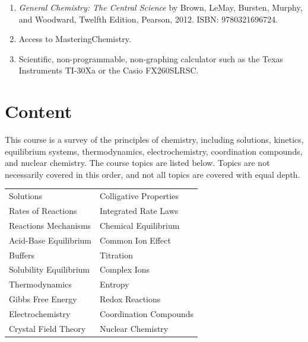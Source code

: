 \documentclass[letterpaper,oneside,onecolumn,11pt,article]{memoir}
\begin{document}
\begin{enumerate}
\item \textit{General Chemistry: The Central Science} by Brown, LeMay, Bursten, Murphy, and Woodward, Twelfth Edition, Pearson, 2012. ISBN: 9780321696724. 

\item Access to MasteringChemistry. 

\item Scientific, non-programmable, non-graphing calculator such as the Texas Instruments TI-30Xa or the  Casio FX260SLRSC.
\end{enumerate}


\section{Content}

This course is a survey of the principles of chemistry, including solutions, kinetics, equilibrium systems, thermodynamics, electrochemistry, coordination compounds, and nuclear chemistry. The course topics are listed below. Topics are not necessarily covered in this order, and not all topics are covered with equal depth.

\begin{table}[h]
\renewcommand{\arraystretch}{1}
\begin{tabular}{l|l} \toprule
Solutions & Colligative Properties \\
Rates of Reactions & Integrated Rate Laws \\
Reactions Mechanisms &  Chemical Equilibrium \\
Acid-Base Equilibrium &  Common Ion Effect \\
Buffers & Titration \\
Solubility Equilibrium & Complex Ions \\
Thermodynamics & Entropy \\
Gibbs Free Energy & Redox Reactions \\
Electrochemistry & Coordination Compounds \\
Crystal Field Theory & Nuclear Chemistry \\
\bottomrule
\end{tabular}
\end{table}
\end{document}
